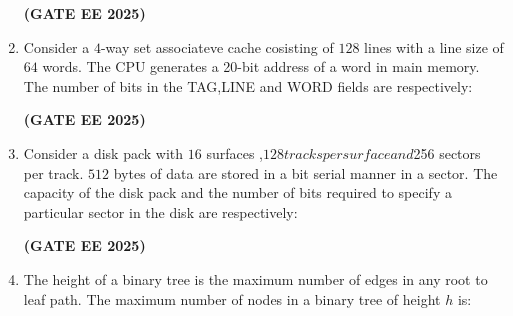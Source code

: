 \documentclass[journal,12pt,onecolumn]{IEEEtran}
\theoremstyle{remark}
\begin{document}
\begin{enumerate}
\begin{enumerate}
\end{enumerate}
\hfill \textbf{(GATE EE 2025)}
\item    Consider a $4$-way set associateve cache cosisting of $128$ lines with a line size of $64$ words. The CPU generates a 20-bit address of a word in main memory. The number of bits in the TAG,LINE and WORD fields are respectively:
\begin{enumerate}

\end{enumerate}
\hfill \textbf{(GATE EE 2025)}
\item     Consider a disk pack with $16$ surfaces ,$128 tracks per surface and $256 sectors per track. $512 $ bytes of data  are stored in a bit serial manner in a sector. The capacity of the disk pack and the number of bits required to specify a particular sector in the disk are respectively:
\begin{enumerate}
 


\end{enumerate}
\hfill \textbf{(GATE EE 2025)}
\item  The height of a binary tree is the maximum number of edges in any root to leaf path. The maximum number of nodes in a binary tree of height $h$ is:
\begin{enumerate}

\end{enumerate}
\end{enumerate}
\end{document}
